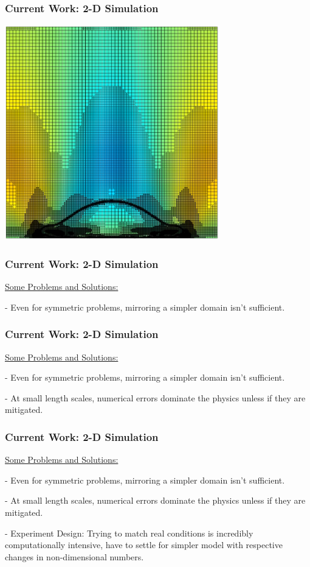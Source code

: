 \documentclass[12pt]{beamer}
\begin{document}
\begin{frame}
    \frametitle{Current Work: 2-D Simulation}
    \includegraphics[width=0.7\textwidth]{img/7-current.png}
\end{frame}
\begin{frame}
    \frametitle{Current Work: 2-D Simulation}
    \underline{Some Problems and Solutions:}

    - Even for symmetric problems, mirroring a simpler domain isn't sufficient.
\end{frame}
\begin{frame}
    \frametitle{Current Work: 2-D Simulation}
    \underline{Some Problems and Solutions:}

    - Even for symmetric problems, mirroring a simpler domain isn't sufficient.

    - At small length scales, numerical errors dominate the physics unless if 
    they are mitigated.
\end{frame}
\begin{frame}
    \frametitle{Current Work: 2-D Simulation}
    \underline{Some Problems and Solutions:}

    - Even for symmetric problems, mirroring a simpler domain isn't sufficient.

    - At small length scales, numerical errors dominate the physics unless if 
    they are mitigated.
    
    - Experiment Design: Trying to match real conditions is incredibly 
    computationally intensive, have to settle for simpler model with respective 
    changes in non-dimensional numbers.
\end{frame}
\end{document}
